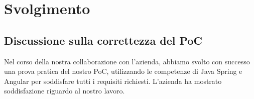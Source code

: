 \section{Svolgimento}

\subsection{Discussione sulla correttezza del PoC}Nel corso della nostra collaborazione con l'azienda, abbiamo svolto con successo una prova pratica del nostro PoC, utilizzando le competenze di Java Spring e Angular per soddisfare tutti i requisiti richiesti. L'azienda ha mostrato soddisfazione riguardo al nostro lavoro.